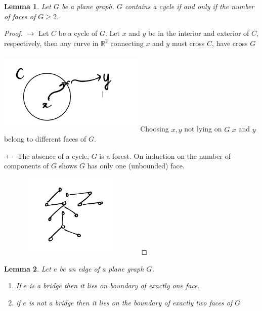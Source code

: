 \documentclass[12pt]{article}
\newtheorem*{lemma}{Lemma}
\newenvironment{pro}{\begin{proof}}{\end{proof}}
\begin{document}
\begin{lemma}
  Let $G$ be a plane graph. $G$ contains a cycle if and only if the number of faces of $G \ge 2$.
\end{lemma}

\begin{pro}
  $\rightarrow$ Let $C$ be a cycle of $G$. Let $x$ and $y$ be in the interior and exterior of $C$, respectively, then any curve in $\mathbb{R}^{2}$ connecting $x$ and $y$ must cross $C$, have cross $G$


  \includegraphics[width=7cm,height=4cm]{circle_proof}
  Choosing $x, y$ not lying on $G$ $x$ and $y$ belong to different faces of $G$.

  $\leftarrow$ The absence of a cycle, $G$ is a forest. On induction on the number of components of $G$ shows $G$ has only one (unbounded) face.


  \includegraphics[width=7cm,height=4cm]{circle_proof2}
\end{pro}



\begin{lemma}
  Let $e$ be an edge of a plane graph $G$.
  \begin{enumerate}
    \item If $e$ is a bridge then it lies on boundary of exactly one face.
    \item if $e$ is not a bridge then it lies on the boundary of exactly two faces of $G$
  \end{enumerate}
\end{lemma}
\end{document}
